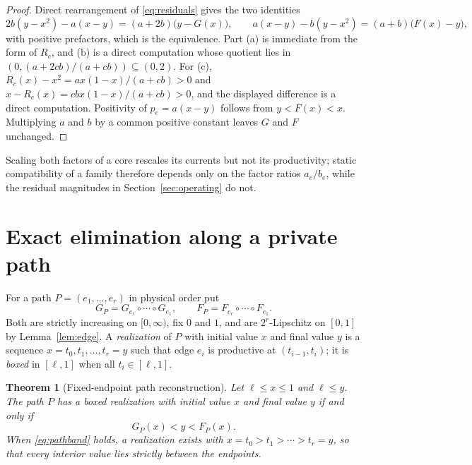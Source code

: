 \documentclass[11pt,a4paper]{article}
\theoremstyle{plain}
\newtheorem{theorem}{Theorem}[section]
\theoremstyle{definition}
\theoremstyle{remark}
\begin{document}
\begin{proof}
Direct rearrangement of \eqref{eq:residuals} gives the two identities
\[
  2b(y-x^2)-a(x-y)=(a+2b)\bigl(y-G(x)\bigr),\qquad a(x-y)-b(y-x^2)=(a+b)\bigl(F(x)-y\bigr),
\]
with positive prefactors, which is the equivalence. Part (a) is immediate from the form of $R_c$, and (b) is a direct computation whose quotient lies in $(0,(a+2cb)/(a+cb))\subseteq(0,2)$. For (c), $R_c(x)-x^2=ax(1-x)/(a+cb)>0$ and $x-R_c(x)=cbx(1-x)/(a+cb)>0$, and the displayed difference is a direct computation. Positivity of $p_e=a(x-y)$ follows from $y<F(x)<x$. Multiplying $a$ and $b$ by a common positive constant leaves $G$ and $F$ unchanged.
\end{proof}

Scaling both factors of a core rescales its currents but not its productivity; static compatibility of a family therefore depends only on the factor ratios $a_e/b_e$, while the residual magnitudes in Section~\ref{sec:operating} do not.

\section{Exact elimination along a private path}\label{sec:path}

For a path $P=(e_1,\dots,e_r)$ in physical order put
\begin{equation}\label{eq:composed}
  G_P=G_{e_r}\circ\cdots\circ G_{e_1},\qquad F_P=F_{e_r}\circ\cdots\circ F_{e_1}.
\end{equation}
Both are strictly increasing on $[0,\infty)$, fix $0$ and $1$, and are $2^r$-Lipschitz on $[0,1]$ by Lemma~\ref{lem:edge}. A \emph{realization} of $P$ with initial value $x$ and final value $y$ is a sequence $x=t_0,t_1,\dots,t_r=y$ such that edge $e_i$ is productive at $(t_{i-1},t_i)$; it is \emph{boxed} in $[\ell,1]$ when all $t_i\in[\ell,1]$.

\begin{theorem}[Fixed-endpoint path reconstruction]\label{thm:path}
Let $\ell\le x\le1$ and $\ell\le y$. The path $P$ has a boxed realization with initial value $x$ and final value $y$ if and only if
\begin{equation}\label{eq:pathband}
  G_P(x)<y<F_P(x).
\end{equation}
When \eqref{eq:pathband} holds, a realization exists with $x=t_0>t_1>\cdots>t_r=y$, so that every interior value lies strictly between the endpoints.
\end{theorem}
\end{document}
